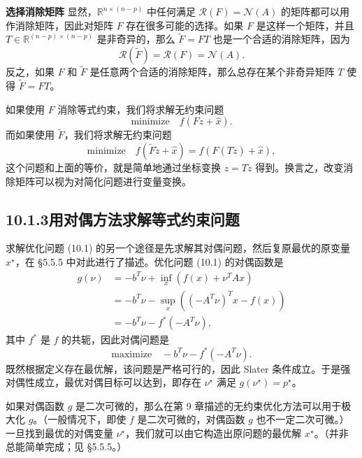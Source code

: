 \documentclass[UTF8,12pt,a4paper,fontset=fandol]{ctexart}
\begin{document}
\noindent\textbf{选择消除矩阵}\quad
显然，$\mathbb{R}^{n\times(n-p)}$ 中任何满足 $\mathcal{R}(F)=\mathcal{N}(A)$ 的矩阵都可以用作消除矩阵，因此对矩阵 $F$ 存在很多可能的选择。如果 $F$ 是这样一个矩阵，并且 $T\in\mathbb{R}^{(n-p)\times(n-p)}$ 是非奇异的，那么 $\tilde{F}=FT$ 也是一个合适的消除矩阵，因为
\[
\mathcal{R}(\tilde{F})=\mathcal{R}(F)=\mathcal{N}(A).
\]
反之，如果 $F$ 和 $\tilde{F}$ 是任意两个合适的消除矩阵，那么总存在某个非奇异矩阵 $T$ 使得 $\tilde{F}=FT$。

如果使用 $F$ 消除等式约束，我们将求解无约束问题
\[
\text{minimize}\quad f(Fz+\hat{x}).
\]
而如果使用 $\tilde{F}$，我们将求解无约束问题
\[
\text{minimize}\quad f(\tilde{F}\tilde{z}+\hat{x})=f(F(T\tilde{z})+\hat{x}),
\]
这个问题和上面的等价，就是简单地通过坐标变换 $z=T\tilde{z}$ 得到。换言之，改变消除矩阵可以视为对简化问题进行变量变换。

\subsection*{10.1.3\quad 用对偶方法求解等式约束问题}

求解优化问题 (10.1) 的另一个途径是先求解其对偶问题，然后复原最优的原变量 $x^\star$，在 \S5.5.5 中对此进行了描述。优化问题 (10.1) 的对偶函数是
\[
\begin{aligned}
g(\nu)
&=-b^T\nu+\inf_x(f(x)+\nu^TAx)\\
&=-b^T\nu-\sup_x\left(( -A^T\nu)^Tx-f(x)\right)\\
&=-b^T\nu-f^\ast(-A^T\nu),
\end{aligned}
\]
其中 $f^\ast$ 是 $f$ 的共轭，因此对偶问题是
\[
\text{maximize}\quad -b^T\nu-f^\ast(-A^T\nu).
\]
既然根据定义存在最优解，该问题是严格可行的，因此 Slater 条件成立。于是强对偶性成立，最优对偶目标可以达到，即存在 $\nu^\star$ 满足 $g(\nu^\star)=p^\star$。

如果对偶函数 $g$ 是二次可微的，那么在第 9 章描述的无约束优化方法可以用于极大化 $g$。（一般情况下，即使 $f$ 是二次可微的，对偶函数 $g$ 也不一定二次可微。）一旦找到最优的对偶变量 $\nu^\star$，我们就可以由它构造出原问题的最优解 $x^\star$。（并非总能简单完成；见 \S5.5.5。）
\end{document}

